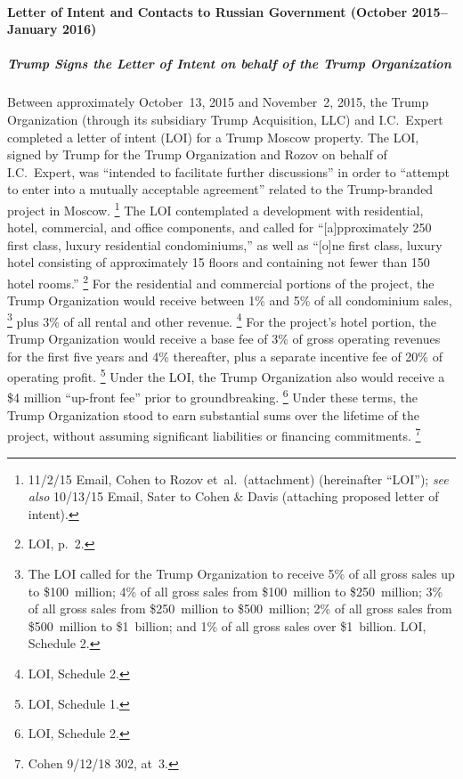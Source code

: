 \paragraph{Letter of Intent and Contacts to Russian Government (October 2015--January 2016)}

\subparagraph{Trump Signs the Letter of Intent on behalf of the Trump Organization}

Between approximately October~13, 2015 and November~2, 2015, the Trump Organization (through its subsidiary Trump Acquisition, LLC) and I.C.~Expert completed a letter of intent (LOI) for a Trump Moscow property.
The LOI, signed by Trump for the Trump Organization and Rozov on behalf of I.C.~Expert, was ``intended to facilitate further discussions'' in order to ``attempt to enter into a mutually acceptable agreement'' related to the Trump-branded project in Moscow.%
\footnote{11/2/15 Email, Cohen to Rozov et~al.\ (attachment) (hereinafter ``LOI'');
\textit{see also} 10/13/15 Email, Sater to Cohen \& Davis (attaching proposed letter of intent).}
The LOI contemplated a development with residential, hotel, commercial, and office components, and called for ``[a]pproximately 250 first class, luxury residential condominiums,'' as well as ``[o]ne first class, luxury hotel consisting of approximately 15 floors and containing not fewer than 150 hotel rooms.''%
\footnote{LOI, p.~2.}
For the residential and commercial portions of the project, the Trump Organization would receive between 1\% and 5\% of all condominium sales,%
\footnote{The LOI called for the Trump Organization to receive 5\% of all gross sales up to \$100~million;
4\% of all gross sales from \$100~million to \$250~million;
3\% of all gross sales from \$250~million to \$500~million;
2\% of all gross sales from \$500~million to \$1~billion;
and 1\% of all gross sales over \$1~billion.
LOI, Schedule 2.}
plus 3\% of all rental and other revenue.%
\footnote{LOI, Schedule 2.}
For the project's hotel portion, the Trump Organization would receive a base fee of 3\% of gross operating revenues for the first five years and 4\% thereafter, plus a separate incentive fee of 20\% of operating profit.%
\footnote{LOI, Schedule 1.}
Under the LOI, the Trump Organization also would receive a \$4 million ``up-front fee'' prior to groundbreaking.%
\footnote{LOI, Schedule 2.}
Under these terms, the Trump Organization stood to earn substantial sums over the lifetime of the project, without assuming significant liabilities or financing commitments.%
\footnote{Cohen 9/12/18 302, at~3.}

